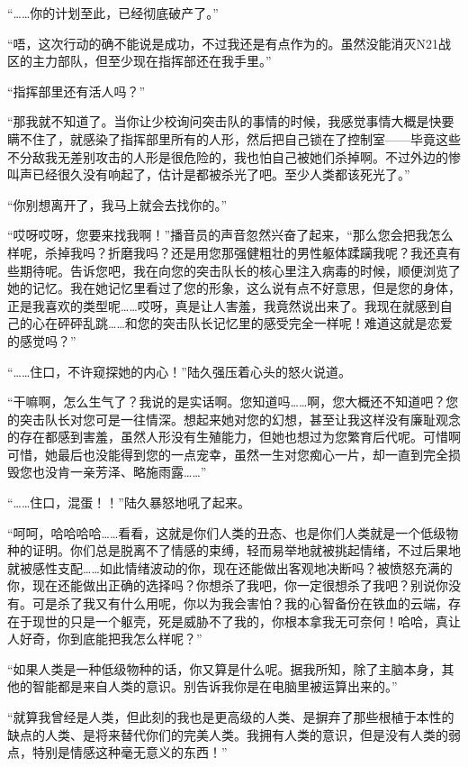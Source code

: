 “……你的计划至此，已经彻底破产了。”

“唔，这次行动的确不能说是成功，不过我还是有点作为的。虽然没能消灭N21战区的主力部队，但至少现在指挥部还在我手里。”

“指挥部里还有活人吗？”

“那我就不知道了。当你让少校询问突击队的事情的时候，我感觉事情大概是快要瞒不住了，就感染了指挥部里所有的人形，然后把自己锁在了控制室——毕竟这些不分敌我无差别攻击的人形是很危险的，我也怕自己被她们杀掉啊。不过外边的惨叫声已经很久没有响起了，估计是都被杀光了吧。至少人类都该死光了。”

“你别想离开了，我马上就会去找你的。”

“哎呀哎呀，您要来找我啊！”播音员的声音忽然兴奋了起来，“那么您会把我怎么样呢，杀掉我吗？折磨我吗？还是用您那强健粗壮的男性躯体蹂躏我呢？我还真有些期待呢。告诉您吧，我在向您的突击队长的核心里注入病毒的时候，顺便浏览了她的记忆。我在她记忆里看过了您的形象，这么说有点不好意思，但是您的身体，正是我喜欢的类型呢……哎呀，真是让人害羞，我竟然说出来了。我现在就感到自己的心在砰砰乱跳……和您的突击队长记忆里的感受完全一样呢！难道这就是恋爱的感觉吗？”

“……住口，不许窥探她的内心！”陆久强压着心头的怒火说道。

“干嘛啊，怎么生气了？我说的是实话啊。您知道吗……啊，您大概还不知道吧？您的突击队长对您可是一往情深。想起来她对您的幻想，甚至让我这样没有廉耻观念的存在都感到害羞，虽然人形没有生殖能力，但她也想过为您繁育后代呢。可惜啊可惜，她最后也没能得到您的一点宠幸，虽然一生对您痴心一片，却一直到完全损毁您也没肯一亲芳泽、略施雨露……”

“……住口，混蛋！！”陆久暴怒地吼了起来。

“呵呵，哈哈哈哈……看看，这就是你们人类的丑态、也是你们人类就是一个低级物种的证明。你们总是脱离不了情感的束缚，轻而易举地就被挑起情绪，不过后果地就被感性支配……如此情绪波动的你，现在还能做出客观地决断吗？被愤怒充满的你，现在还能做出正确的选择吗？你想杀了我吧，你一定很想杀了我吧？别说你没有。可是杀了我又有什么用呢，你以为我会害怕？我的心智备份在铁血的云端，存在于现世的只是一个躯壳，死是威胁不了我的，你根本拿我无可奈何！哈哈，真让人好奇，你到底能把我怎么样呢？”

“如果人类是一种低级物种的话，你又算是什么呢。据我所知，除了主脑本身，其他的智能都是来自人类的意识。别告诉我你是在电脑里被运算出来的。”

“就算我曾经是人类，但此刻的我也是更高级的人类、是摒弃了那些根植于本性的缺点的人类、是将来替代你们的完美人类。我拥有人类的意识，但是没有人类的弱点，特别是情感这种毫无意义的东西！”

